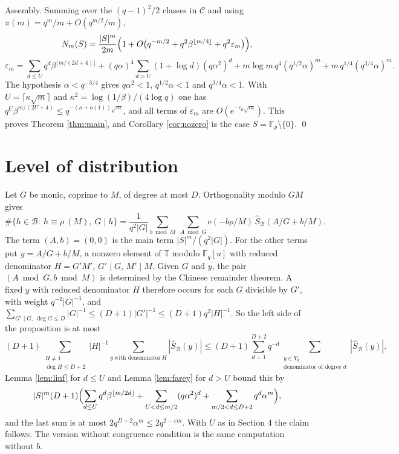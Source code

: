 \documentclass[11pt]{amsart}
\makeatletter
\theoremstyle{definition}
\renewenvironment{proof}[1][\proofname]{\par\pushQED{\qed}\normalfont\topsep6\p@\@plus6\p@\relax\trivlist\item[\hskip\labelsep\upshape #1\@addpunct{.}]\ignorespaces}{\popQED\endtrivlist\@endpefalse}
\newcommand{\F}{\mathbb{F}}
\newcommand{\T}{\mathbb{T}}
\newcommand{\cB}{\mathcal{B}}
\newcommand{\cC}{\mathcal{C}}
\newcommand{\e}{\mathrm{e}}
\makeatother
\begin{document}
Assembly. Summing over the $(q-1)^2/2$ classes in $\cC$ and using $\pi(m)=q^m/m+O(q^{m/2}/m)$,
\[
N_m(S)=\frac{|S|^m}{2m}\Bigl(1+O\bigl(q^{-m/2}+q^2\beta^{\lfloor m/4\rfloor}+q^2\varepsilon_m\bigr)\Bigr),
\]
\[
\varepsilon_m=\sum_{d\le U}q^d\beta^{\lfloor m/(2d+4)\rfloor}+(q\alpha)^4\sum_{d>U}(1+\log d)(q\alpha^2)^d+m\log m\,q^{4}(q^{1/2}\alpha)^m+m\,q^{1/4}(q^{3/4}\alpha)^m.
\]
The hypothesis $\alpha<q^{-3/4}$ gives $q\alpha^2<1$, $q^{1/2}\alpha<1$ and $q^{3/4}\alpha<1$. With $U=\lceil\kappa\sqrt m\rceil$ and $\kappa^2=\log(1/\beta)/(4\log q)$ one has $q^U\beta^{m/(2U+4)}\le q^{-(\kappa+o(1))\sqrt m}$, and all terms of $\varepsilon_m$ are $O(e^{-c_0\sqrt m})$. This proves Theorem \ref{thm:main}, and Corollary \ref{cor:nozero} is the case $S=\F_p\setminus\{0\}$. \qed

\section{Level of distribution}

\begin{proof}[Proof of Proposition \ref{prop:level}]
Let $G$ be monic, coprime to $M$, of degree at most $D$. Orthogonality modulo $GM$ gives
\[
\#\{h\in\cB:\ h\equiv\rho\ (M),\ G\mid h\}=\frac{1}{q^2|G|}\sum_{b\bmod M}\ \sum_{A\bmod G}\e(-b\rho/M)\,\hat S_\cB(A/G+b/M).
\]
The term $(A,b)=(0,0)$ is the main term $|S|^m/(q^2|G|)$. For the other terms put $y=A/G+b/M$, a nonzero element of $\T$ modulo $\F_q[u]$ with reduced denominator $H=G'M'$, $G'\mid G$, $M'\mid M$. Given $G$ and $y$, the pair $(A\bmod G,b\bmod M)$ is determined by the Chinese remainder theorem. A fixed $y$ with reduced denominator $H$ therefore occurs for each $G$ divisible by $G'$, with weight $q^{-2}|G|^{-1}$, and $\sum_{G'\mid G,\ \deg G\le D}|G|^{-1}\le(D+1)|G'|^{-1}\le(D+1)q^2|H|^{-1}$. So the left side of the proposition is at most
\[
(D+1)\sum_{\substack{H\ne1\\ \deg H\le D+2}}|H|^{-1}\sum_{y\ \text{with denominator}\ H}|\hat S_\cB(y)|\le(D+1)\sum_{d=1}^{D+2}q^{-d}\sum_{\substack{y\in Y_d\\ \text{denominator of degree }d}}|\hat S_\cB(y)|.
\]
Lemma \ref{lem:linf} for $d\le U$ and Lemma \ref{lem:farey} for $d>U$ bound this by
\[
|S|^m(D+1)\Bigl(\sum_{d\le U}q^d\beta^{\lfloor m/2d\rfloor}+\sum_{U<d\le m/2}(q\alpha^2)^d+\sum_{m/2<d\le D+2}q^{d}\alpha^m\Bigr),
\]
and the last sum is at most $2q^{D+2}\alpha^m\le2q^{2-\varepsilon m}$. With $U$ as in Section 4 the claim follows. The version without congruence condition is the same computation without $b$.
\end{proof}
\end{document}
